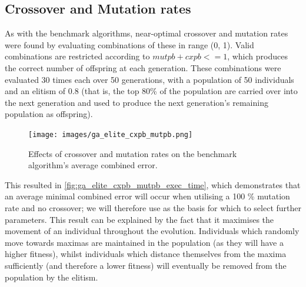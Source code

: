 \documentclass[authoryearcitations]{UoYCSproject}
\begin{document}
\subsection{Crossover and Mutation rates}
\label{subsec:elite_cxpb_mupb}
As with the benchmark algorithms, near-optimal crossover and mutation rates were found by evaluating combinations of these in range (0, 1). Valid combinations are restricted according to $mutpb + cxpb <= 1$, which produces the correct number of offspring at each generation. These combinations were evaluated 30 times each over 50 generations, with a population of 50 individuals and an elitism of 0.8 (that is, the top 80\% of the population are carried over into the next generation and used to produce the next generation's remaining population as offspring). 

\begin{figure}[ht]
\centering
	\texttt{[image: images/ga\_elite\_cxpb\_mutpb.png]}
	\caption{Effects of crossover and mutation rates on the benchmark algorithm's average combined error.}
	\label{fig:ga_elite_cxpb_mutpb_exec_time}
\end{figure}

This resulted in \autoref{fig:ga_elite_cxpb_mutpb_exec_time}, which demonstrates that an average minimal combined error will occur when utilising a 100 \% mutation rate and no crossover; we will therefore use as the basis for which to select further parameters. This result can be explained by the fact that it maximises the movement of an individual throughout the evolution. Individuals which randomly move towards maximas are maintained in the population (as they will have a higher fitness), whilst individuals which distance themselves from the maxima sufficiently (and therefore a lower fitness) will eventually be removed from the population by the elitism.



\end{document}
